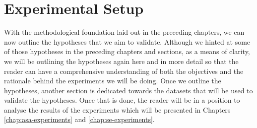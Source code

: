 \documentclass[logo,bsc,singlespacing,parskip,online]{infthesis}
\begin{document}
\chapter{Experimental Setup}
\label{chap:experimental_setup}
With the methodological foundation laid out in the preceding chapters, we can now outline the hypotheses that we aim to validate.
Although we hinted at some of those hypotheses in the preceding chapters and sections, as a means of clarity, 
we will be outlining the hypotheses again here and in more detail so that the reader can have a comprehensive understanding of both the objectives and the rationale behind the experiments we will be doing.
Once we outline the hypotheses, another section is dedicated towards the datasets that will be used to validate the hypotheses.
Once that is done, the reader will be in a position to analyse the results of the experiments which will be presented in Chapters \ref{chap:asa-experiments} and \ref{chap:se-experiments}.
\end{document}
